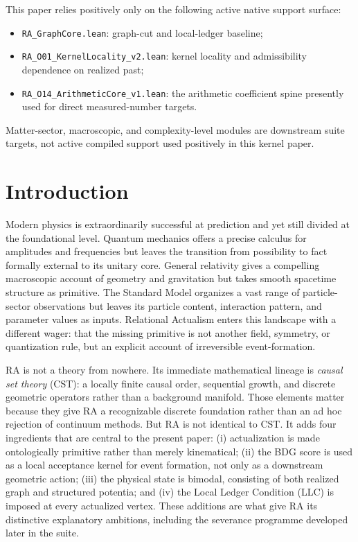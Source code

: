 \documentclass[11pt]{article}
\begin{document}
\begin{tcolorbox}[title=Active Native Support Surface Used Positively,colback=gray!5,colframe=gray!60]
This paper relies positively only on the following active native support surface:
\begin{itemize}[nosep]
    \item \texttt{RA\_GraphCore.lean}: graph-cut and local-ledger baseline;
    \item \texttt{RA\_O01\_KernelLocality\_v2.lean}: kernel locality and admissibility dependence on realized past;
    \item \texttt{RA\_O14\_ArithmeticCore\_v1.lean}: the arithmetic coefficient spine presently used for direct measured-number targets.
\end{itemize}
Matter-sector, macroscopic, and complexity-level modules are downstream suite targets, not active compiled support used positively in this kernel paper.
\end{tcolorbox}


\section{Introduction}

Modern physics is extraordinarily successful at prediction and yet still divided at the foundational level. Quantum mechanics offers a precise calculus for amplitudes and frequencies but leaves the transition from possibility to fact formally external to its unitary core. General relativity gives a compelling macroscopic account of geometry and gravitation but takes smooth spacetime structure as primitive. The Standard Model organizes a vast range of particle-sector observations but leaves its particle content, interaction pattern, and parameter values as inputs. Relational Actualism enters this landscape with a different wager: that the missing primitive is not another field, symmetry, or quantization rule, but an explicit account of irreversible event-formation.

RA is not a theory from nowhere. Its immediate mathematical lineage is \emph{causal set theory} (CST): a locally finite causal order, sequential growth, and discrete geometric operators rather than a background manifold. Those elements matter because they give RA a recognizable discrete foundation rather than an ad hoc rejection of continuum methods. But RA is not identical to CST. It adds four ingredients that are central to the present paper: (i) actualization is made ontologically primitive rather than merely kinematical; (ii) the BDG score is used as a local acceptance kernel for event formation, not only as a downstream geometric action; (iii) the physical state is bimodal, consisting of both realized graph and structured potentia; and (iv) the Local Ledger Condition (LLC) is imposed at every actualized vertex. These additions are what give RA its distinctive explanatory ambitions, including the severance programme developed later in the suite.
\end{document}
